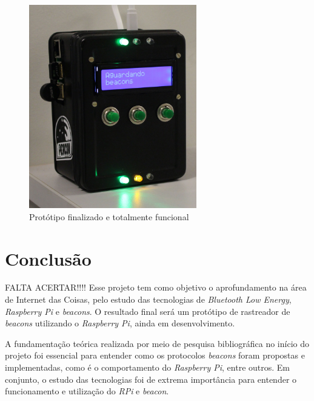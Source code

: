 \documentclass[
		12pt,				%
		openright,			%
		oneside,			%
		a4paper,			%
		chapter=TITLE,		%
		english,			%
		brazil				%
	]{abntex2}
\begin{document}
\begin{figure}[htb]
	\caption{\label{fig:prod-final}Protótipo finalizado e totalmente funcional}
	\begin{center}
		\includegraphics[width=0.65\textwidth]{img/prod-final.jpg}
	\end{center}
\end{figure}



\chapter{Conclusão}

FALTA ACERTAR!!!! Esse projeto tem como objetivo o aprofundamento na área de Internet das Coisas, pelo estudo das tecnologias de \textit{Bluetooth Low Energy}, \textit{Raspberry Pi} e \textit{beacons}. O resultado final será um protótipo de rastreador de \textit{beacons} utilizando o \textit{Raspberry Pi}, ainda em desenvolvimento.

A fundamentação teórica realizada por meio de pesquisa bibliográfica no início do projeto foi essencial para entender como os protocolos \textit{beacons} foram propostas e implementadas, como é o comportamento do \textit{Raspberry Pi}, entre outros. Em conjunto, o estudo das tecnologias foi de extrema importância para entender o funcionamento e utilização do \textit{RPi} e \textit{beacon}.
\end{document}
